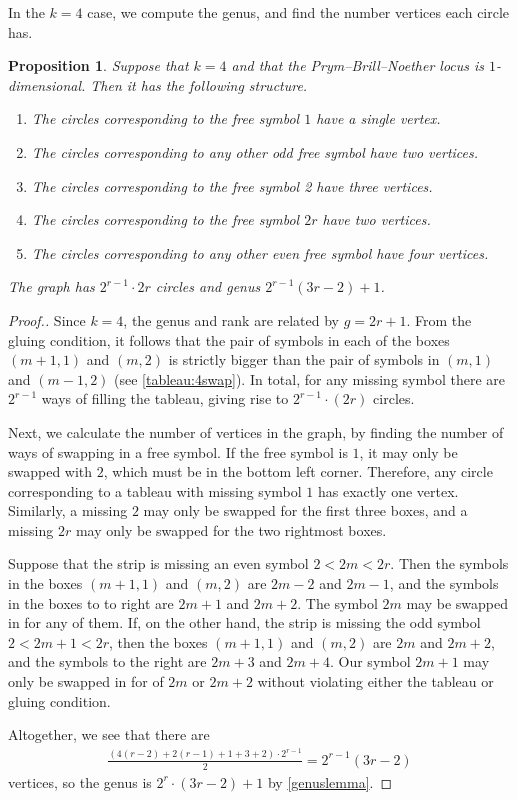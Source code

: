 \documentclass[11pt,reqno]{amsart}
\theoremstyle{definition}
\theoremstyle{problem}
\theoremstyle{plain}
\newtheorem{proposition}[definition]{Proposition}
\theoremstyle{remark}
\theoremstyle{theorem}
\numberwithin{equation}{section}
\numberwithin{figure}{section}
\begin{document}
In the $k=4$ case, we compute the genus, and find the number vertices each circle has.

\begin{proposition}
  \label{prop:k4dim1}
  Suppose that $k=4$ and that the Prym--Brill--Noether locus is $1$-dimensional. Then it has the following structure. 
  \begin{enumerate}[label=(\roman*)]
      \item The circles corresponding to the free symbol $1$ have a single vertex.
      \item The circles corresponding to any other odd free symbol have two vertices.
      \item The circles corresponding to the free symbol 2 have three vertices.
      \item The circles corresponding to the free symbol $2r$ have two vertices.
      \item The circles corresponding to any other even free symbol have four vertices.
  \end{enumerate}
  The graph has $2^{r-1}\cdot 2r$ circles and genus $2^{r-1}(3r-2)+1$.
\end{proposition}

\begin{proof}[Proof.]
 Since $k=4$, the genus and rank are related by $g=2r+1$. From the gluing condition, it follows that the pair of symbols in each of the boxes $(m+1,1)$ and $(m,2)$ is strictly bigger than the pair of symbols in $(m,1)$ and $(m-1,2)$ (see \cref{tableau:4swap}). In total, for any missing symbol there are $2^{r-1}$ ways of filling the tableau, giving rise to $2^{r-1}\cdot (2r)$ circles. 
 
 Next, we calculate the number of vertices in the graph, by finding the number of ways of swapping in a free symbol.
  If the free symbol is $1$, it may only be swapped with $2$, which must be in the bottom left corner. Therefore, any circle corresponding to a tableau with missing symbol $1$ has exactly one vertex. Similarly, a missing $2$ may only be swapped for the first three boxes, and a missing $2r$ may only be swapped for the two rightmost boxes.
  
Suppose that the strip is missing an even symbol $2<2m<2r$. Then the symbols in the boxes $(m+1,1)$ and $(m,2)$ are $2m-2$ and $2m-1$, and the symbols in the boxes to to right are $2m+1$ and $2m+2$. The symbol $2m$ may be swapped in for  any of them. 
If, on the other hand, the strip is missing the odd symbol $2<2m+1<2r$, then the boxes  $(m+1,1)$ and $(m,2)$ are $2m$ and $2m+2$, and the symbols to the right are $2m+3$ and $2m+4$. Our symbol $2m+1$ may only be swapped in for of $2m$ or $2m+2$ without violating either the tableau or gluing condition. 

Altogether, we see that there are 
  \begin{gather*}
\frac{(4(r-2) + 2(r-1) + 1 + 3 + 2) \cdot 2^{r-1}}{2} = 2^{r-1}(3r-2)
\end{gather*}
vertices,  so the genus is $2^r\cdot (3r-2) + 1$  by \cref{genuslemma}. 
\end{proof}
\end{document}
